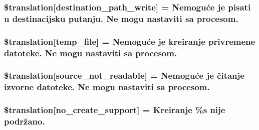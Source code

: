 \subsubsection[{\$translation}]{\setlength{\rightskip}{0pt plus 5cm}\$translation\mbox{[}\textquotesingle{}destination\+\_\+path\+\_\+write\textquotesingle{}\mbox{]} = \textquotesingle{}Nemoguće je pisati u destinacijsku putanju. Ne mogu nastaviti sa procesom.\textquotesingle{}}\label{class_8upload_8hr___h_r_8php_a40e4e1962226b89fd76da5819a9602b0}
\hypertarget{class_8upload_8hr___h_r_8php_a2baece8da11e20d45175db91851ec3e3}{}
\subsubsection[{\$translation}]{\setlength{\rightskip}{0pt plus 5cm}\$translation\mbox{[}\textquotesingle{}temp\+\_\+file\textquotesingle{}\mbox{]} = \textquotesingle{}Nemoguće je kreiranje privremene datoteke. Ne mogu nastaviti sa procesom.\textquotesingle{}}\label{class_8upload_8hr___h_r_8php_a2baece8da11e20d45175db91851ec3e3}
\hypertarget{class_8upload_8hr___h_r_8php_a922967ca2df0efdd455261142d8e5715}{}
\subsubsection[{\$translation}]{\setlength{\rightskip}{0pt plus 5cm}\$translation\mbox{[}\textquotesingle{}source\+\_\+not\+\_\+readable\textquotesingle{}\mbox{]} = \textquotesingle{}Nemoguće je čitanje izvorne datoteke. Ne mogu nastaviti sa procesom.\textquotesingle{}}\label{class_8upload_8hr___h_r_8php_a922967ca2df0efdd455261142d8e5715}
\hypertarget{class_8upload_8hr___h_r_8php_a346dfd1ade29f583dd20d345c436859f}{}
\subsubsection[{\$translation}]{\setlength{\rightskip}{0pt plus 5cm}\$translation\mbox{[}\textquotesingle{}no\+\_\+create\+\_\+support\textquotesingle{}\mbox{]} = \textquotesingle{}Kreiranje \%s nije podržano.\textquotesingle{}}\label{class_8upload_8hr___h_r_8php_a346dfd1ade29f583dd20d345c436859f}
\hypertarget{class_8upload_8hr___h_r_8php_a53013ce9255c4e1849098ddd9fdb2b3f}{}
